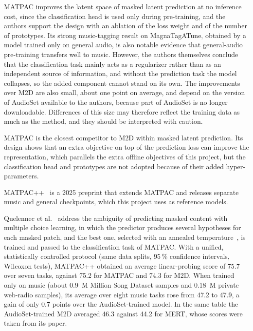 \documentclass{FastFyp}
\begin{document}
\lrcritical
MATPAC improves the latent space of masked latent prediction at no inference cost, since the classification head is used only during pre-training, and the authors support the design with an ablation of the loss weight and of the number of prototypes. Its strong music-tagging result on MagnaTagATune, obtained by a model trained only on general audio, is also notable evidence that general-audio pre-training transfers well to music. However, the authors themselves conclude that the classification task mainly acts as a regularizer rather than as an independent source of information, and without the prediction task the model collapses, so the added component cannot stand on its own. The improvements over M2D are also small, about one point on average, and depend on the version of AudioSet available to the authors, because part of AudioSet is no longer downloadable. Differences of this size may therefore reflect the training data as much as the method, and they should be interpreted with caution.

\lrrelation
MATPAC is the closest competitor to M2D within masked latent prediction. Its design shows that an extra objective on top of the prediction loss can improve the representation, which parallels the extra offline objectives of this project, but the classification head and prototypes are not adopted because of their added hyper-parameters.

MATPAC++~\cite{ref:Quelennec:2025matpacpp} is a 2025 preprint that extends MATPAC and releases separate music and general checkpoints, which this project uses as reference models.

\lrsummary
Quelennec et al.~\cite{ref:Quelennec:2025matpacpp} address the ambiguity of predicting masked content with multiple choice learning, in which the predictor produces several hypotheses for each masked patch, and the best one, selected with an annealed temperature~\cite{ref:Perera:2024annealed}, is trained and passed to the classification task of MATPAC. With a unified, statistically controlled protocol (same data splits, 95\,\% confidence intervals, Wilcoxon tests), MATPAC++ obtained an average linear-probing score of 75.7 over seven tasks, against 75.2 for MATPAC and 74.3 for M2D. When trained only on music (about 0.9~M Million Song Dataset samples and 0.18~M private web-radio samples), its average over eight music tasks rose from 47.2 to 47.9, a gain of only 0.7 points over the AudioSet-trained model. In the same table the AudioSet-trained M2D averaged 46.3 against 44.2 for MERT, whose scores were taken from its paper.
\end{document}
